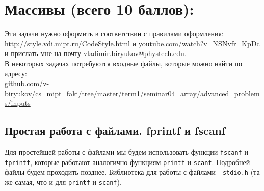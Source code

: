 \documentclass{article}
\begin{document}


\section*{Массивы (всего 10 баллов):}

Эти задачи нужно оформить в соответствии с правилами оформления: \\ 
\href{http://style.vdi.mipt.ru/CodeStyle.html}{http://style.vdi.mipt.ru/CodeStyle.html} и 
\href{https://www.youtube.com/watch?v=NSNvfr_KpDc}{youtube.com/watch?v=NSNvfr\_KpDc}\\
 и прислать мне на почту \href{mailto:vladimir.biryukov@phystech.edu}{vladimir.biryukov@phystech.edu}.\\
В некоторых задачах потребуются входные файлы, которые можно найти по адресу: \\
\href{https://github.com/v-biryukov/cs_mipt_faki/tree/master/term1/seminar04_array/advanced_problems/inputs}{github.com/v-biryukov/cs\_mipt\_faki/tree/master/term1/seminar04\_array/advanced\_problems/inputs}
\subsection{Простая работа с файлами. fprintf и fscanf}
Для простейшей работы с файлами мы будем использовать функции \texttt{fscanf} и \texttt{fprintf}, которые работают аналогично функциям \texttt{printf} и \texttt{scanf}. Подробней файлы будем проходить позднее. Библиотека для работы с файлами - \texttt{stdio.h} (та же самая, что и для \texttt{printf} и \texttt{scanf}).
\end{document}

